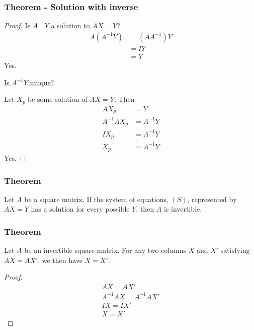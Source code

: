 \documentclass[usenames,dvipsnames,aspectratio=169,10pt]{beamer}
\numberwithin{equation}{section}
\begin{document}
\begin{frame}
\frametitle{Theorem - Solution with inverse}

\begin{proof}
\begin{minipage}{0.4\textwidth}
\underline{Is $A^{-1}Y$ a solution to $AX=Y$?}
\begin{align*}
A(A^{-1}Y) &= (AA^{-1})Y \\
 &= IY \\
 &= Y
\end{align*}
Yes.
\end{minipage}\hspace{1cm}
\begin{minipage}{0.4\textwidth}
\underline{Is $A^{-1}Y$ unique?}

Let $X_p$ be some solution of $AX=Y$. Then
\begin{align*}
 AX_p &= Y \\
 A^{-1} AX_p &= A^{-1}Y \\
 IX_p &= A^{-1}Y \\
 X_p &= A^{-1}Y
\end{align*}
Yes.
\end{minipage}

\end{proof}
\end{frame}


\begin{frame}
\frametitle{Theorem}

Let $A$ be a square matrix. If the system of equations, $(S)$, represented by $AX = Y$ has a solution for every possible $Y$, then $A$ is invertible.

\end{frame}


\begin{frame}
\frametitle{Theorem}

Let $A$ be an invertible square matrix. For any two columns $X$ and $X'$ satisfying $AX=AX'$, we then have $X=X'$.

\begin{proof}
\begin{gather*}
AX = AX' \\
A^{-1}AX = A^{-1}AX' \\
IX = IX' \\
X = X'
\end{gather*}
\end{proof}

\end{frame}
\end{document}
